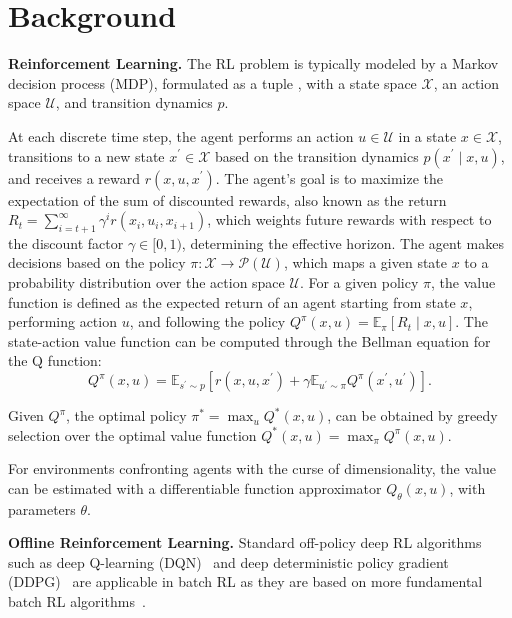 \section{Background}
\label{sec:background}
\noindent\textbf{Reinforcement Learning.}
The RL problem is typically modeled by a Markov decision process (MDP), formulated as a tuple , with a state space $\mathcal{X}$, an action space $\mathcal{U}$, and transition dynamics $p$. 


At each discrete time step, the agent performs an action \( u \in \mathcal{U} \) in a state \( x \in \mathcal{X} \), transitions to a new state \( x^{\prime} \in \mathcal{X} \) based on the transition dynamics \(p(x^{\prime} \mid x, u)\), and receives a reward \( r(x, u, x^{\prime}) \). The agent's goal is to maximize the expectation of the sum of discounted rewards, also known as the return \( R_{t} = \sum_{i=t+1}^{\infty} \gamma^{i} r(x_{i}, u_{i}, x_{i+1}) \), which weights future rewards with respect to the discount factor \( \gamma \in [0,1) \), determining the effective horizon. The agent makes decisions based on the policy \( \pi: \mathcal{X} \rightarrow \mathcal{P}(\mathcal{U}) \), which maps a given state \( x \) to a probability distribution over the action space \( \mathcal{U} \). For a given policy \( \pi \), the value function is defined as the expected return of an agent starting from state \( x \), performing action \( u \), and following the policy \( Q^{\pi}(x, u) = \mathbb{E}_{\pi}[R_{t} \mid x, u] \). The state-action value function can be computed through the Bellman equation for the Q function:
\begin{equation}
Q^{\pi}(x, u)=\mathbb{E}_{s^{\prime} \sim p}\left[r\left(x, u, x^{\prime}\right)+\gamma \mathbb{E}_{u^{\prime} \sim \pi} Q^{\pi}(x^{\prime}, u^{\prime})\right].
\end{equation}

Given $Q^{\pi}$, the optimal policy $\pi^{*}=\operatorname{max}_{u} Q^{*}(x, u)$, can be obtained by greedy selection over the optimal value function $Q^{*}(x, u)=\max_{\pi} Q^{\pi}(x, u)$. 

For environments confronting agents with the curse of dimensionality, the value can be estimated with a
differentiable function approximator $Q_\theta(x, u)$, with parameters $\theta$. 



\noindent\textbf{Offline Reinforcement Learning.}
Standard off-policy deep RL algorithms such as deep Q-learning (DQN)~\citep{mnih2015human} and deep deterministic policy gradient (DDPG)~\citep{lillicrap2015continuous} are applicable in batch RL as they are based on more fundamental batch RL algorithms~\citep{fujimoto2019benchmarking}. 

